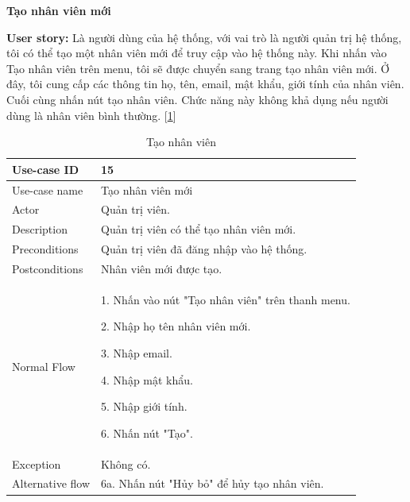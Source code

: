 \newpage
\textbf{Tạo nhân viên mới}\par
\textbf{User story:} Là người dùng của hệ thống, với vai trò là người quản trị hệ thống, tôi có thể tạo một nhân viên mới để truy cập vào hệ thống này. Khi nhấn vào Tạo nhân viên trên menu, tôi sẽ được chuyển sang trang tạo nhân viên mới. Ở đây, tôi cung cấp các thông tin họ, tên, email, mật khẩu, giới tính của nhân viên. Cuối cùng nhấn nút tạo nhân viên. Chức năng này không khả dụng nếu người dùng là nhân viên bình thường. [\ref{bang15}]
\begin{table}[!htp]
    \centering
    \begin{tabular}{|m{3cm}|m{10cm}|}
    \hline 
        Use-case ID & 15\\ \hline
        Use-case name & Tạo nhân viên mới\\ \hline
        Actor & Quản trị viên.\\ \hline
        Description & Quản trị viên có thể tạo nhân viên mới.\\ \hline
        Preconditions & Quản trị viên đã đăng nhập vào hệ thống.\\ \hline
        Postconditions & Nhân viên mới được tạo.\\ \hline
        Normal Flow & 
        1. Nhấn vào nút "Tạo nhân viên" trên thanh menu.\par 
        2. Nhập họ tên nhân viên mới.\par
        3. Nhập email.\par
        4. Nhập mật khẩu.\par
        5. Nhập giới tính.\par
        6. Nhấn nút "Tạo".
        \\ \hline
        Exception & Không có.
        \\ \hline
        Alternative flow & 
        6a. Nhấn nút "Hủy bỏ" để hủy tạo nhân viên.
        \\ 
    \hline 
    \end{tabular}
    \caption{Tạo nhân viên}
    \label{bang15}
\end{table}

